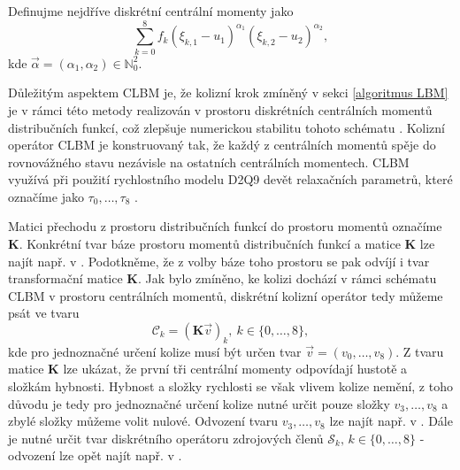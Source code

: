Definujme nejdříve diskrétní centrální momenty jako
\begin{equation}\label{eq:centralmoment} 
\sum_{k=0}^{8} f_{k} (\xi_{k,1}  - u_{1})^{\alpha_{1}} (\xi_{k,2}  - u_{2})^{\alpha_{2}},
\end{equation}
kde $ \vec{\alpha} = (\alpha_{1}, \alpha_{2}) \in \mathbb{N}^2_{0}$.
%

Důležitým aspektem CLBM je, že kolizní krok zmíněný v sekci \ref{algoritmus LBM} je v rámci této metody realizován v prostoru diskrétních centrálních momentů distribučních funkcí, což zlepšuje numerickou stabilitu tohoto schématu \cite{GeierCLBM}. Kolizní operátor CLBM je konstruovaný tak, že každý z centrálních momentů spěje do rovnovážného stavu nezávisle na ostatních centrálních momentech. CLBM využívá při použití rychlostního modelu D2Q9 devět relaxačních parametrů, které označíme jako $ \tau_{0}, \dots, \tau_{8} $ \cite{DP-PE}. 

Matici přechodu z prostoru distribučních funkcí do prostoru momentů označíme $ \mathbf{K} $. Konkrétní tvar báze prostoru momentů distribučních funkcí a matice $ \mathbf{K} $ lze najít např. v \cite{DP-PE}. Podotkněme, že z volby báze toho prostoru se pak odvíjí i tvar transformační matice $ \mathbf{K} $. Jak bylo zmíněno, ke kolizi dochází v rámci schématu CLBM v prostoru centrálních momentů, diskrétní kolizní operátor tedy můžeme psát ve tvaru
\begin{equation}\label{eq:clbm collision}
	\mathcal{C}_k = (\mathbf{K} \vec{v})_k, \ k \in \{0, \dots, 8 \},
\end{equation}
kde pro jednoznačné určení kolize musí být určen tvar $ \vec{v} = (v_0, \dots, v_8)$. Z tvaru matice $ \mathbf{K} $ lze ukázat, že první tři centrální momenty odpovídají hustotě a složkám hybnosti. Hybnost a složky rychlosti se však vlivem kolize nemění, z toho důvodu je tedy pro jednoznačné určení kolize nutné určit pouze složky $ v_3, \dots, v_8 $ a zbylé složky můžeme volit nulové. Odvození tvaru $ v_3, \dots, v_8 $	 lze najít např. v \cite{GeierCLBM, DP-PE}. Dále je nutné určit tvar diskrétního operátoru zdrojových členů $ \mathcal{S}_k, \, k \in \{ 0, \dots, 8\} $ - odvození lze opět najít např. v \cite{GeierCLBM, DP-PE}.


